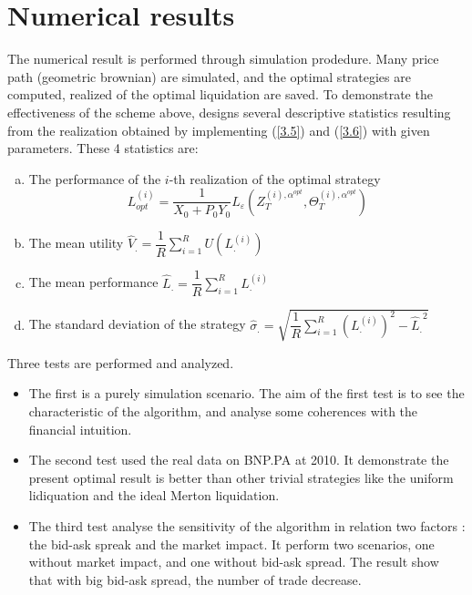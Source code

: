 \documentclass[a4paper,10pt]{article}
\begin{document}
\section{Numerical results}
\par The numerical result is performed through simulation prodedure. Many price path (geometric brownian) are simulated, and the optimal strategies are computed, realized of the optimal liquidation are saved. To demonstrate the effectiveness of the scheme above, \cite{GMP} designs several descriptive statistics resulting from the realization obtained by implementing (\ref{3.5}) and (\ref{3.6}) with given parameters. These 4 statistics are: 
\begin{enumerate}[(a)]
  \setlength{\parskip}{0pt}
  \setlength{\parsep}{0pt}
\item The performance of the $i$-th realization of the optimal strategy
\[
L_{opt}^{(i)} = \frac{1}{{{X_0} + {P_0}{Y_0}}}{L_\varepsilon }\left( {Z_T^{(i),{\alpha ^{opt}}},\Theta _T^{(i),{\alpha ^{opt}}}} \right)
\]
\item The mean utility ${\widehat V_.} = \dfrac{1}{R}\sum\limits_{i = 1}^R {U\left( {L_.^{(i)}} \right)}$
\item The mean performance ${\widehat L_.} = \dfrac{1}{R}\sum\limits_{i = 1}^R {L_.^{(i)}}$
\item The standard deviation of the strategy ${\widehat \sigma _.} = \sqrt {\dfrac{1}{R}\sum\limits_{i = 1}^R {{{\left( {L_.^{(i)}} \right)}^2}}  - {{\widehat L}_.}^2}$
\end{enumerate}
Three tests are performed and analyzed. 
\begin{itemize}
 \item The first is a purely simulation scenario. The aim of the first test is to see the characteristic of the algorithm, and analyse some coherences with the financial intuition.
 \item The second test used the real data on BNP.PA at 2010. It demonstrate the present optimal result is better than other trivial strategies like the uniform lidiquation and the ideal Merton liquidation.
 \item The third test analyse the sensitivity of the algorithm in relation two factors : the bid-ask spreak and the market impact. It perform two scenarios, one without market impact, and one without bid-ask spread. The result show that with big bid-ask spread, the number of trade decrease. 
\end{itemize}
\end{document}
